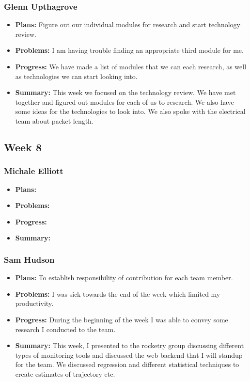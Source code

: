 \documentclass[onecolumn, draftclsnofoot,10pt, compsoc]{IEEEtran}
\begin{document}
\subsubsection{Glenn Upthagrove}
\begin {itemize}
 \item \textbf{Plans: }Figure out our individual modules for research and start technology review.
 \item \textbf{Problems: }I am having trouble finding an appropriate third module for me. 
 \item \textbf{Progress: }We have made a list of modules that we can each research, as well as technologies we can start looking into. 
 \item \textbf{Summary: }This week we focused on the technology review. We have met together and figured out modules for each of us to research. We also have some ideas for the technologies to look into. We also spoke with the electrical team about packet length. 
\end {itemize}
\subsection {Week 8}
\subsubsection{Michale Elliott}
\begin {itemize}
 \item \textbf{Plans: }
 \item \textbf{Problems: }
 \item \textbf{Progress: }
 \item \textbf{Summary: }
\end {itemize}
\subsubsection{Sam Hudson}
\begin {itemize}
\item \textbf{Plans: }To establish responsibility of contribution for each team member.
\item \textbf{Problems: }I was sick towards the end of the week which limited my productivity. 
\item \textbf{Progress: }During the beginning of the week I was able to convey some research I conducted to the team.
\item \textbf{Summary: }This week, I presented to the rocketry group discussing different types of monitoring tools and discussed the web backend that I will standup for the team. We discussed regression and different statistical techniques to create estimates of trajectory etc.
\end {itemize}
\end{document}
